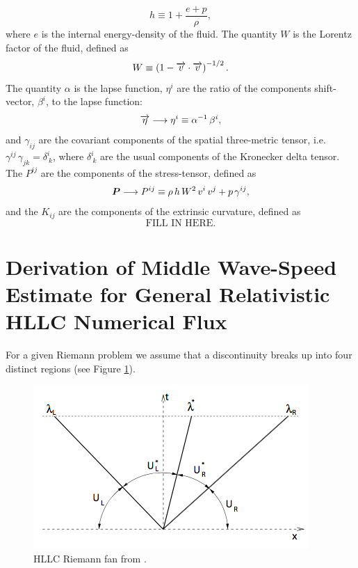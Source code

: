 \documentclass[10pt,preprint]{../aastex}
\newcommand{\figref}[1]{Figure \ref{#1}}
\begin{document}
\begin{equation}
h\equiv1+\frac{e+p}{\rho},
\end{equation}
where $e$ is the internal energy-density of the fluid. The quantity $W$ is the Lorentz factor of the fluid, defined as
\begin{equation}
W\equiv\left(1-\overrightarrow{v}\cdot\overrightarrow{v}\right)^{-1/2}.
\end{equation}
The quantity $\alpha$ is the lapse function, $\eta^{i}$ are the ratio of the components shift-vector, $\beta^{i}$, to the lapse function:
\begin{equation}
\overrightarrow{\eta}\longrightarrow\eta^{i}\equiv\alpha^{-1}\,\beta^{i},
\end{equation}
and $\gamma_{ij}$ are the covariant components of the spatial three-metric tensor, i.e. $\gamma^{ij}\,\gamma_{jk}=\delta^{i}_{~k}$, where $\delta^{i}_{~k}$ are the usual components of the Kronecker delta tensor. The $P^{ij}$ are the components of the stress-tensor, defined as
\begin{equation}
\boldsymbol{P}\longrightarrow P^{ij}\equiv\rho\,h\,W^{2}\,v^{i}\,v^{j}+p\,\gamma^{ij},
\end{equation}
and the $K_{ij}$ are the components of the extrinsic curvature, defined as
\begin{equation}
\text{FILL IN HERE}.
\end{equation}

\section{Derivation of Middle Wave-Speed Estimate for General Relativistic HLLC Numerical Flux}
For a given Riemann problem we assume that a discontinuity breaks up into four distinct regions (see \figref{Fig:HLLC_RiemannFan}).
\begin{figure}[H]
\centering
\includegraphics[scale=0.5]{HLLC_RiemannFan_MB2005}
\caption{HLLC Riemann fan from \citet{Mignone2005}.}\label{Fig:HLLC_RiemannFan}
\end{figure}
\end{document}
